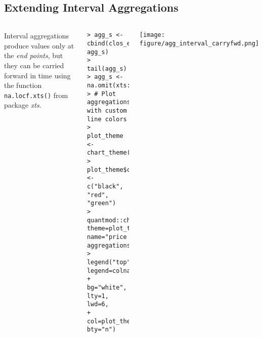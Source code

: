\documentclass[10pt]{beamer}\usepackage[]{graphicx}\usepackage[]{color}
\makeatletter
\newenvironment{kframe}{%
 \def\at@end@of@kframe{}%
 \ifinner\ifhmode%
  \def\at@end@of@kframe{\end{minipage}}%
  \begin{minipage}{\columnwidth}%
 \fi\fi%
 \def\FrameCommand##1{\hskip\@totalleftmargin \hskip-\fboxsep
 \colorbox{shadecolor}{##1}\hskip-\fboxsep
     \hskip-\linewidth \hskip-\@totalleftmargin \hskip\columnwidth}%
 \MakeFramed {\advance\hsize-\width
   \@totalleftmargin\z@ \linewidth\hsize
   \@setminipage}}%
 {\par\unskip\endMakeFramed%
 \at@end@of@kframe}
\newenvironment{knitrout}{}{} %
\makeatother
\begin{document}
\subsection{Extending Interval Aggregations}
\begin{frame}[fragile,t]{\subsecname}
\vspace{-1em}
\begin{block}{}
  \begin{columns}[T]
      Interval aggregations produce values only at the \emph{end points}, but they can be carried forward in time using the function \texttt{na.locf.xts()} from package \emph{xts}.
\begin{knitrout}\tiny
{}\color{fgcolor}\begin{kframe}
\begin{verbatim}
> agg_s <- cbind(clos_e, agg_s)
> tail(agg_s)
> agg_s <- na.omit(xts:::na.locf.xts(agg_s))
> # Plot aggregations with custom line colors
> plot_theme <- chart_theme()
> plot_theme$col$line.col <- c("black", "red", "green")
> quantmod::chart_Series(agg_s, theme=plot_theme, name="price aggregations")
> legend("top", legend=colnames(agg_s),
+   bg="white", lty=1, lwd=6,
+   col=plot_theme$col$line.col, bty="n")
\end{verbatim}
\end{kframe}
\end{knitrout}
      \texttt{[image: figure/agg\_interval\_carryfwd.png]}\\
  \end{columns}
\end{block}

\end{frame}


\end{document}
